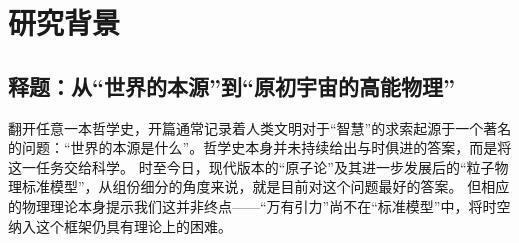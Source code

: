 
\chapter{研究背景}

\section{释题：从“世界的本源”到“原初宇宙的高能物理”}

翻开任意一本哲学史，开篇通常记录着人类文明对于“智慧”的求索起源于一个著名的问题：“世界的本源是什么”。哲学史本身并未持续给出与时俱进的答案，而是将这一任务交给科学。
时至今日，现代版本的“原子论”及其进一步发展后的“粒子物理标准模型”，从组份细分的角度来说，就是目前对这个问题最好的答案。
但相应的物理理论本身提示我们这并非终点——“万有引力”尚不在“标准模型”中，将时空纳入这个框架仍具有理论上的困难。

